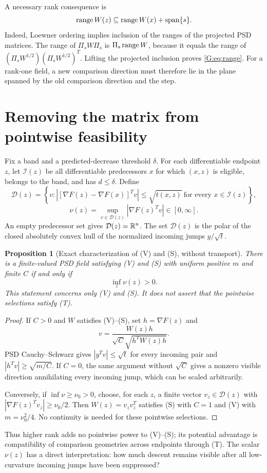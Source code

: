 \documentclass[10pt,oneside,openany]{book}
\newtheorem{proposition}{Proposition}[chapter]
\theoremstyle{remark}\newtheorem{remark}{Remark}[chapter]
\begin{document}
A necessary rank consequence is
\begin{equation}
 \operatorname{range} W(z)\subseteq\operatorname{range} W(x)+\operatorname{span}\{s\}. \label{G:eq:range}
\end{equation}
Indeed, Loewner ordering implies inclusion of the ranges of the projected PSD matrices. The range of $\Pi_sW\Pi_s$ is $\Pi_s\operatorname{range} W$, because it equals the range of $(\Pi_sW^{1/2})(\Pi_sW^{1/2})^T$. Lifting the projected inclusion proves \eqref{G:eq:range}. For a rank-one field, a new comparison direction must therefore lie in the plane spanned by the old comparison direction and the step.


\setcounter{section}{2}
\setcounter{theorem}{0}
\setcounter{equation}{3}
\section{Removing the matrix from pointwise feasibility}
Fix a band and a predicted-decrease threshold $\delta$. For each differentiable endpoint $z$, let $\mathcal I(z)$ be all differentiable predecessors $x$ for which $(x,z)$ is eligible, belongs to the band, and has $d\le\delta$. Define
\[
 \mathcal D(z)=\left\{v:\left|[\nabla F(z)-\nabla F(x)]^Tv\right|
       \le\sqrt{t(x,z)}\ \text{for every }x\in\mathcal I(z)\right\},
\]
\begin{equation}
 \nu(z)=\sup_{v\in\mathcal D(z)}|\nabla F(z)^Tv|\in[0,\infty]. \label{G:eq:nu}
\end{equation}
An empty predecessor set gives $\mathcal D(z)=\mathbb R^n$. The set $\mathcal D(z)$ is the polar of the closed absolutely convex hull of the normalized incoming jumps $y/\sqrt t$.

\begin{proposition}[Exact characterization of (V) and (S), without transport]
There is a finite-valued PSD field satisfying (V) and (S) with uniform positive $m$ and finite $C$ if and only if
\[
 \inf_z\nu(z)>0.
\]
This statement concerns only (V) and (S). It does not assert that the pointwise selections satisfy (T).
\end{proposition}
\begin{proof}
If $C>0$ and $W$ satisfies (V)--(S), set $h=\nabla F(z)$ and
\[
 v=\frac{W(z)h}{\sqrt C\sqrt{h^TW(z)h}}.
\]
PSD Cauchy--Schwarz gives $|y^Tv|\le\sqrt t$ for every incoming pair and
$|h^Tv|\ge\sqrt{m/C}$. If $C=0$, the same argument without $\sqrt C$ gives a nonzero visible direction annihilating every incoming jump, which can be scaled arbitrarily.

Conversely, if $\inf\nu\ge\nu_0>0$, choose, for each $z$, a finite vector $v_z\in\mathcal D(z)$ with $|\nabla F(z)^Tv_z|\ge\nu_0/2$. Then $W(z)=v_zv_z^T$ satisfies (S) with $C=1$ and (V) with $m=\nu_0^2/4$. No continuity is needed for these pointwise selections.
\end{proof}
Thus higher rank adds no pointwise power to (V)--(S); its potential advantage is compatibility of comparison geometries across endpoints through (T). The scalar $\nu(z)$ has a direct interpretation: how much descent remains visible after all low-curvature incoming jumps have been suppressed?
\end{document}
